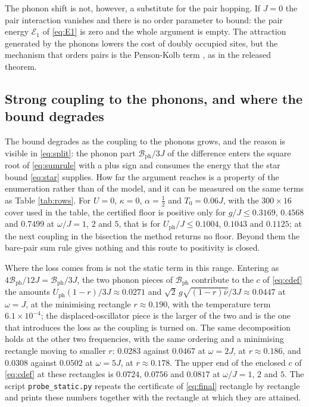 \documentclass[11pt]{article}
\numberwithin{equation}{section}
\newcommand{\ph}{\mathrm{ph}}
\theoremstyle{definition}
\begin{document}
The phonon shift is not, however, a substitute for the pair hopping. If $J=0$ the pair
interaction vanishes and there is no order parameter to bound: the pair energy
$\mathcal{E}_{1}$ of \eqref{eq:E1} is zero and the whole argument is empty. The attraction generated by the phonons lowers the cost of doubly
occupied sites, but the mechanism that orders pairs is the Penson-Kolb term
\cite{penson1986}, as in the released theorem.

\subsection{Strong coupling to the phonons, and where the bound degrades}

The bound degrades as the coupling to the phonons grows, and the reason is visible in
\eqref{eq:split}: the phonon part $\mathcal{B}_{\ph}/3J$ of the difference enters the
square root of \eqref{eq:sumrule} with a plus sign and consumes the energy that the star
bound \eqref{eq:star} supplies. How far the argument reaches is a property of the
enumeration rather than of the model, and it can be measured on the same terms as Table
\ref{tab:rows}. For $U=0$, $\kappa=0$, $\alpha=\frac12$ and $T_0=0.06J$, with the
$300\times16$ cover used in the table, the certified floor is positive only for
$g/J\le0.3169$, $0.4568$ and $0.7499$ at $\omega/J=1$, $2$ and $5$, that is for
$U_{\mathrm{ph}}/J\le0.1004$, $0.1043$ and $0.1125$; at the next coupling in the bisection
the method returns no floor. Beyond them the bare-pair sum rule gives nothing and this
route to positivity is closed.

Where the loss comes from is not the static term in this range. Entering as
$4\mathcal{B}_{\ph}/12J=\mathcal{B}_{\ph}/3J$, the two phonon pieces of
$\mathcal{B}_{\ph}$ contribute to the $c$ of \eqref{eq:cdef} the amounts
$U_{\mathrm{ph}}(1-r)/3J\approx0.0271$ and $\sqrt2\,g\sqrt{(1-r)\bar\nu}/3J\approx0.0447$
at $\omega=J$, at the minimising rectangle $r\approx0.190$, with the temperature term
$6.1\times10^{-4}$; the displaced-oscillator piece is the larger of the two and is the one
that introduces the loss as the coupling is turned on. The same decomposition holds at the
other two frequencies, with the same ordering and a minimising rectangle moving to smaller
$r$: $0.0283$ against $0.0467$ at $\omega=2J$, at $r\approx0.186$, and $0.0308$ against
$0.0502$ at $\omega=5J$, at $r\approx0.178$. The upper end of the enclosed $c$ of
\eqref{eq:cdef} at these rectangles is $0.0724$, $0.0756$ and $0.0817$ at
$\omega/J=1$, $2$ and $5$. The script \texttt{probe\_static.py} repeats
the certificate of \eqref{eq:final} rectangle by rectangle and prints these numbers
together with the rectangle at which they are attained.
\end{document}
